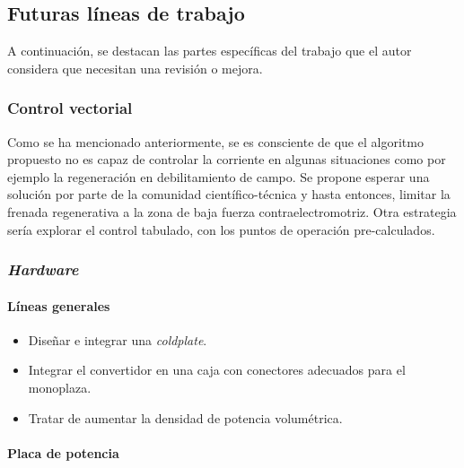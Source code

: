 \subsection{Futuras líneas de trabajo}

A continuación, se destacan las partes específicas del trabajo que el autor considera que necesitan una revisión o mejora.

\subsubsection{Control vectorial}

Como se ha mencionado anteriormente, se es consciente de que el algoritmo propuesto no es capaz de controlar la corriente en algunas situaciones como por ejemplo la regeneración en debilitamiento de campo. Se propone esperar una solución por parte de la comunidad científico-técnica y hasta entonces, limitar la frenada regenerativa a la zona de baja fuerza contraelectromotriz. Otra estrategia sería explorar el control tabulado, con los puntos de operación pre-calculados.

\subsubsection{\textit{Hardware}}

\paragraph{Líneas generales}
\begin{itemize}
	\item Diseñar e integrar una \textit{coldplate}.
	\item Integrar el convertidor en una caja con conectores adecuados para el monoplaza.
	\item Tratar de aumentar la densidad de potencia volumétrica.
\end{itemize}
\paragraph{Placa de potencia}

